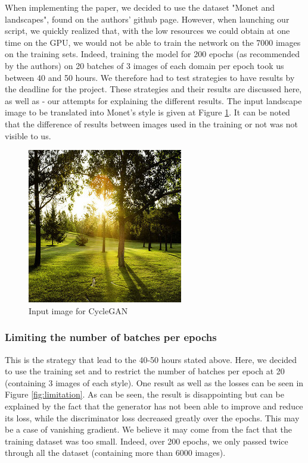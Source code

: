 \documentclass[twocolumn,superscriptaddress,aps,floatfix, nofootinbib]{revtex4-1}
\begin{document}
    When implementing the paper, we decided to use the dataset "Monet and landscapes", found on the authors' github page\cite{cycgit}. However, when launching our script, we quickly realized that, with the low resources we could obtain at one time on the GPU, we would not be able to train the network on the 7000 images on the training sets. Indeed, training the model for 200 epochs (as recommended by the authors) on 20 batches of 3 images of each domain per epoch took us between 40 and 50 hours. We therefore had to test strategies to have results by the deadline for the project. These strategies and their results are discussed here, as well as - our attempts for explaining the different results. The input landscape image to be translated into Monet's style is given at Figure \ref{fig:landscape}. It can be noted that the difference of results between images used in the training or not was not visible to us.
    \begin{figure}[H]
        \centering
        \includegraphics[scale=0.5]{resources/png/inputs/test.jpg}
        \caption{Input image for CycleGAN}
        \label{fig:landscape}
    \end{figure}
    
    \subsubsection{Limiting the number of batches per epochs}\label{limiting}
    
    This is the strategy that lead to the 40-50 hours stated above. Here, we decided to use the training set and to restrict the number of batches per epoch at 20 (containing 3 images of each style). One result as well as the losses can be seen in Figure \ref{fig:limitation}. As can be seen, the result is disappointing but can be explained by the fact that the generator has not been able to improve and reduce its loss, while the discriminator loss decreased greatly over the epochs. This may be a case of vanishing gradient. We believe it may come from the fact that the training dataset was too small. Indeed, over 200 epochs, we only passed twice through all the dataset (containing more than 6000 images).
    
\end{document}
